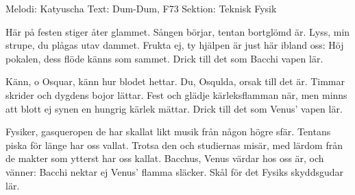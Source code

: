 \begin{song}

\begin{songmeta}
Melodi: Katyuscha
Text: Dum-Dum, F73
Sektion: Teknisk Fysik
\end{songmeta}

\begin{songtext}
Här på festen stiger åter glammet.
Sången börjar, tentan bortglömd är.
Lyss, min strupe, du plågas utav dammet.
Frukta ej, ty hjälpen är just här ibland oss:
Höj pokalen, dess flöde känns som sammet.
Drick till det som Bacchi vapen lär.

Känn, o Osquar, känn hur blodet hettar.
Du, Osqulda, orsak till det är.
Timmar skrider och dygdens bojor lättar.
Fest och glädje kärleksflamman när, men minns att
blott ej synen en hungrig kärlek mättar.
Drick till det som Venus' vapen lär.

Fysiker, gasqueropen de har skallat
likt musik från någon högre sfär.
Tentans piska för länge har oss vallat.
Trotsa den och studiernas misär, med lärdom
från de makter som ytterst har oss kallat.
Bacchus, Venus värdar hos oss är, och vänner:
Bacchi nektar ej Venus' flamma släcker.
Skål för det Fysiks skyddsgudar lär.
\end{songtext}
\end{song}
